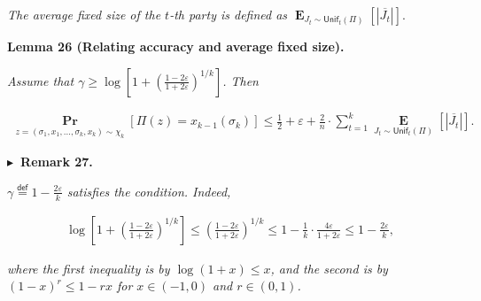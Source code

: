 \documentclass[10pt,a4paper]{article}
\begin{document}
\emph{The average fixed size of the $t$-th party is defined as
$\operatorname*{\mathbf{E}}_{J_{t}\sim\mathsf{Unif}_{t}(\Pi)}\left[|\overline{J_{t}}|\right].$}\par







\par\medskip\noindent\textbf{
\textbf{Lemma 26}\textbf{ }(Relating accuracy and average fixed size)\textbf{.}
}\par



\emph{Assume that $\gamma\geq\log\left[1+\left(\frac{1-2\varepsilon}{1+2\varepsilon}\right)^{1/k}\right]$.
Then}\par


\[\begin{gathered}
\operatorname*{\mathbf{Pr}}_{z=(\sigma_{1},x_{1},\dots,\sigma_{k},x_{k})\sim\chi_{k}}\left[\Pi(z)=x_{k-1}(\sigma_{k})\right]\leq\frac{1}{2}+\varepsilon+\frac{2}{n}\cdot\sum_{t=1}^{k}\operatorname*{\mathbf{E}}_{J_{t}\sim\mathsf{Unif}_{t}(\Pi)}\left[|\overline{J_{t}}|\right].
\end{gathered}\]







\par\medskip\noindent\textbf{
$\blacktriangleright$ Remark 27.
}\par



$\gamma\stackrel{{\scriptstyle\mathsf{def}}}{{=}}1-\frac{2\varepsilon}{k}$\emph{ satisfies the condition.
Indeed,}\par


\[\begin{gathered}
\log\left[1+\left(\frac{1-2\varepsilon}{1+2\varepsilon}\right)^{1/k}\right]\leq\left(\frac{1-2\varepsilon}{1+2\varepsilon}\right)^{1/k}\leq 1-\frac{1}{k}\cdot\frac{4\varepsilon}{1+2\varepsilon}\leq 1-\frac{2\varepsilon}{k},
\end{gathered}\]


\emph{where the first inequality is by $\log(1+x)\leq x$, and the second is by $(1-x)^{r}\leq 1-rx$ for $x\in(-1,0)$ and $r\in(0,1)$.}\par



\end{document}
